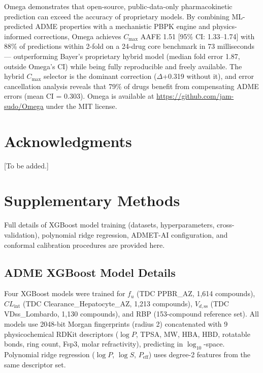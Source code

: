 \documentclass[review,3p]{elsarticle}
\begin{document}
Omega demonstrates that open-source, public-data-only pharmacokinetic prediction can exceed the accuracy of proprietary models. By combining ML-predicted ADME properties with a mechanistic PBPK engine and physics-informed corrections, Omega achieves $C_{\max}$ AAFE 1.51 [95\% CI: 1.33--1.74] with 88\% of predictions within 2-fold on a 24-drug core benchmark in 73 milliseconds --- outperforming Bayer's proprietary hybrid model (median fold error 1.87, outside Omega's CI) while being fully reproducible and freely available. The hybrid $C_{\max}$ selector is the dominant correction ($\Delta$+0.319 without it), and error cancellation analysis reveals that 79\% of drugs benefit from compensating ADME errors (mean CI = 0.303). Omega is available at \url{https://github.com/jam-sudo/Omega} under the MIT license.


\section*{Acknowledgments}

[To be added.]






\section*{Supplementary Methods}
\label{sec:suppmethods}

Full details of XGBoost model training (datasets, hyperparameters, cross-validation), polynomial ridge regression, ADMET-AI configuration, and conformal calibration procedures are provided here.

\subsection*{ADME XGBoost Model Details}

Four XGBoost models were trained for $f_u$ (TDC PPBR\_AZ, 1,614 compounds), $CL_{\text{int}}$ (TDC Clearance\_Hepatocyte\_AZ, 1,213 compounds), $V_{d,\text{ss}}$ (TDC VDss\_Lombardo, 1,130 compounds), and RBP (153-compound reference set). All models use 2048-bit Morgan fingerprints (radius 2) concatenated with 9 physicochemical RDKit descriptors ($\log P$, TPSA, MW, HBA, HBD, rotatable bonds, ring count, Fsp3, molar refractivity), predicting in $\log_{10}$-space. Polynomial ridge regression ($\log P$, $\log S$, $P_{\text{eff}}$) uses degree-2 features from the same descriptor set.
\end{document}
